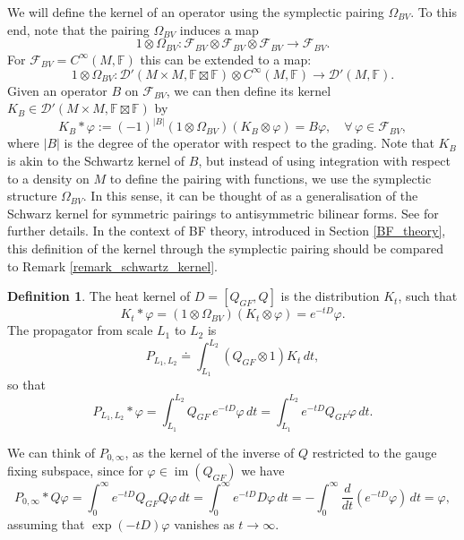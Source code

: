\documentclass[reqno]{amsart}
\theoremstyle{definition}
\newtheorem{defn}[thm]{Definition}
\theoremstyle{remark}
\renewcommand{\phi}{\varphi}
\newcommand{\D}{\mathcal{D}'}
\newcommand{\C}{C^\infty}
\newcommand{\FF}{\mathbb{F}}
\newcommand{\F}{\mathcal{F}}
\DeclareMathOperator{\im}{im}
\begin{document}
We will define the kernel of an operator using the symplectic pairing $\Omega_{BV}$. To this end, note that the pairing $\Omega_{BV}$ induces a map 
$$1\otimes\Omega_{BV}: \F_{BV}\otimes\F_{BV}\otimes\F_{BV} \to \F_{BV}.$$ 
For $\F_{BV} = \C(M,\FF)$ this can be extended to a map:
$$1\otimes\Omega_{BV}: \D(M\times M, \FF\boxtimes \FF)\otimes\C(M,\FF) \to \D(M,\FF).$$
Given an operator $B$ on $\F_{BV}$, we can then define its kernel $K_B\in\D(M\times M, \FF\boxtimes\FF)$ by
\begin{equation}
\label{BV_kernel}
    K_B * \phi := (-1)^{|B|}(1\otimes\Omega_{BV})(K_B\otimes\phi) = B\phi, \quad \forall\,\phi\in\F_{BV},
\end{equation}
where $|B|$ is the degree of the operator with respect to the grading.
Note that $K_B$ is akin to the Schwartz kernel of $B$, but instead of using integration with respect to a density on $M$ to define the pairing with functions, we use the symplectic structure $\Omega_{BV}$. In this sense, it can be thought of as a generalisation of the Schwarz kernel for symmetric pairings to antisymmetric bilinear forms. See \cite{costello} for further details. In the context of BF theory, introduced in Section \ref{BF_theory}, this definition of the kernel through the symplectic pairing should be compared to Remark \ref{remark_schwartz_kernel}.


\begin{defn}\label{def:propagator}
The heat kernel of $D=[Q_{GF},Q]$ is the distribution $K_t$, such that
\begin{equation}
\label{heat_kernel_costello}
    K_t * \phi = (1\otimes\Omega_{BV})(K_t\otimes\phi) = e^{-tD}\phi.
\end{equation}
The propagator from scale $L_1$ to $L_2$ is
\begin{equation}
\label{propagator_costello}
    P_{L_1,L_2} \doteq \int_{L_1}^{L_2}(Q_{GF}\otimes1)K_t\,dt,
\end{equation}
so that
$$P_{L_1,L_2} * \phi = \int_{L_1}^{L_2} Q_{GF}\,e^{-tD}\phi\,dt = \int_{L_1}^{L_2} e^{-tD}Q_{GF}\phi\,dt.$$
\end{defn}

\begin{rmk}
We can think of $P_{0,\infty}$, as the kernel of the inverse of $Q$ restricted to the gauge fixing subspace, since for $\phi\in\im(Q_{GF})$ we have
$$
P_{0,\infty} * Q\varphi = \int_0^\infty e^{-tD}Q_{GF}Q\phi\,dt = \int_0^\infty e^{-tD}D\phi\,dt = -\int_0^\infty \frac{d}{dt}\left(e^{-tD}\phi\right)\,dt = \phi,$$
assuming that $\exp(-tD)\phi$ vanishes as $t\to\infty$.
\end{rmk}
\end{document}
